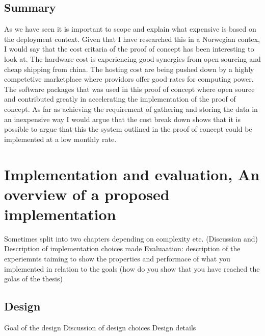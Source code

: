 \documentclass[]{uiophd}
\begin{document}
\section{Summary}
As we have seen it is important to scope and explain what expensive is based on the deployment context. Given that I have researched this in a Norwegian contex, I would say that the cost critaria of the proof of concept has been interesting to look at. The hardware cost is experiencing good synergies from open sourcing and cheap shipping from china. The hosting cost are being pushed down by a highly competetive marketplace where providors offer good rates for computing power. The software packages that was used in this proof of concept where open source and contributed greatly in accelerating the implementation of the proof of concept. As far as achieving the requirement of gathering and storing the data in an inexpensive way I would argue that the cost break down shows that it is possible to argue that this the system outlined in the proof of concept could be implemented at a low monthly rate.


\chapter{Implementation and evaluation, An overview of a proposed implementation}

Sometimes split into two chapters depending on complexity etc.
(Discussion and) Description of implementation choices made 
Evaluaation: description of the experiemnts taiming to show the properties 
and performace of what you implemented in relation to the goals (how do you show that you have reached the golas of the thesis)


\section{Design}

Goal of the design
Discussion of design choices
Design details
\end{document}

